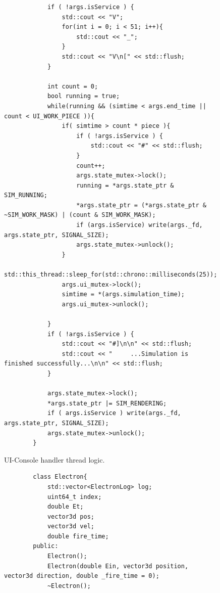 \documentclass[a4paper,oneside,12pt]{report}
\numberwithin{equation}{chapter}
\begin{document}
{\begin{figure}[H]
\begin{verbatim}
            if ( !args.isService ) {
                std::cout << "V";
                for(int i = 0; i < 51; i++){
                    std::cout << "_";
                }
                std::cout << "V\n[" << std::flush;
            }
        
            int count = 0;
            bool running = true;
            while(running && (simtime < args.end_time || count < UI_WORK_PIECE )){
                if( simtime > count * piece ){
                    if ( !args.isService ) {
                        std::cout << "#" << std::flush;
                    }
                    count++;
                    args.state_mutex->lock();
                    running = *args.state_ptr & SIM_RUNNING;
                    *args.state_ptr = (*args.state_ptr & ~SIM_WORK_MASK) | (count & SIM_WORK_MASK);
                    if (args.isService) write(args._fd, args.state_ptr, SIGNAL_SIZE);
                    args.state_mutex->unlock();
                }
                std::this_thread::sleep_for(std::chrono::milliseconds(25));
                args.ui_mutex->lock();
                simtime = *(args.simulation_time);
                args.ui_mutex->unlock();
        
            }
            if ( !args.isService ) {
                std::cout << "#]\n\n" << std::flush;
                std::cout << "     ...Simulation is finished successfully...\n\n" << std::flush;
            }
        
            args.state_mutex->lock();
            *args.state_ptr |= SIM_RENDERING;
            if ( args.isService ) write(args._fd, args.state_ptr, SIGNAL_SIZE);
            args.state_mutex->unlock();
        }
    \end{verbatim}
    \vspace{0pt}
    \caption{UI-Console handler thread logic.}
    \label{fig:ui_thread}
\end{figure}


\begin{figure}[H]
    \centering
    \begin{verbatim}
        class Electron{
            std::vector<ElectronLog> log;
            uint64_t index;
            double Et;
            vector3d pos;
            vector3d vel;
            double fire_time;
        public:
            Electron();
            Electron(double Ein, vector3d position, vector3d direction, double _fire_time = 0);
            ~Electron();


\end{verbatim}
\end{figure}}
\end{document}
